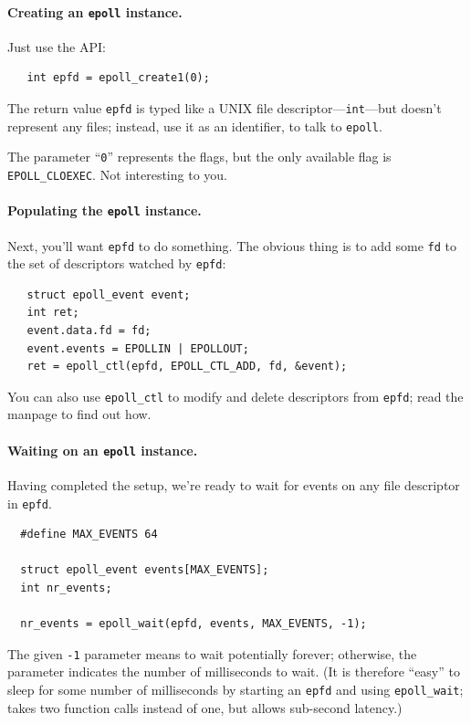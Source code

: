 \paragraph{Creating an {\tt epoll} instance.} Just use the API:
    \begin{verbatim}
   int epfd = epoll_create1(0);
    \end{verbatim}

The return value {\tt epfd} is typed like a UNIX file
descriptor---{\tt int}---but doesn't represent any files; instead, use
it as an identifier, to talk to {\tt epoll}.

The parameter ``{\tt 0}'' represents the flags, but the only available flag
is {\tt EPOLL\_CLOEXEC}. Not interesting to you.

\paragraph{Populating the {\tt epoll} instance.} Next, you'll want
{\tt epfd} to do something. The obvious thing is to add some {\tt fd}
to the set of descriptors watched by {\tt epfd}:
    \begin{verbatim}
   struct epoll_event event;
   int ret;
   event.data.fd = fd;
   event.events = EPOLLIN | EPOLLOUT;
   ret = epoll_ctl(epfd, EPOLL_CTL_ADD, fd, &event);
    \end{verbatim}

You can also use {\tt epoll\_ctl} to modify and delete descriptors from {\tt epfd}; read the manpage to find out how.

\paragraph{Waiting on an {\tt epoll} instance.} Having completed
the setup, we're ready to wait for events on any file descriptor in {\tt epfd}.
    \begin{verbatim}
  #define MAX_EVENTS 64

  struct epoll_event events[MAX_EVENTS];
  int nr_events;

  nr_events = epoll_wait(epfd, events, MAX_EVENTS, -1);
    \end{verbatim}

The given {\tt -1} parameter means to wait potentially forever;
otherwise, the parameter indicates the number of milliseconds to wait.
(It is therefore ``easy'' to sleep for some number of milliseconds by
starting an {\tt epfd} and using {\tt epoll\_wait}; takes two function
calls instead of one, but allows sub-second latency.)

